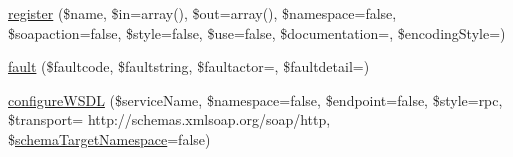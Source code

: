 \begin{DoxyCompactItemize}
\hyperlink{classnusoap__server_a17b5ba99bab794b0a9584592f6e23b04}{register} (\$name, \$in=array(), \$out=array(), \$namespace=false, \$soapaction=false, \$style=false, \$use=false, \$documentation=\textquotesingle{}\textquotesingle{}, \$encoding\+Style=\textquotesingle{}\textquotesingle{})
\item 
\hyperlink{classnusoap__server_ac6a9b7aaeeeecd1e365f8846d4bfc2d9}{fault} (\$faultcode, \$faultstring, \$faultactor=\textquotesingle{}\textquotesingle{}, \$faultdetail=\textquotesingle{}\textquotesingle{})
\item 
\hyperlink{classnusoap__server_a569306e1dcc17e55d737ef6096709e65}{configure\+W\+S\+D\+L} (\$service\+Name, \$namespace=false, \$endpoint=false, \$style=\textquotesingle{}rpc\textquotesingle{}, \$transport= \textquotesingle{}http\+://schemas.\+xmlsoap.\+org/soap/http\textquotesingle{}, \$\hyperlink{_admin_8php_ab197a5bef9bb7041545b3f0b6db00f8f}{schema\+Target\+Namespace}=false)
\end{DoxyCompactItemize}
